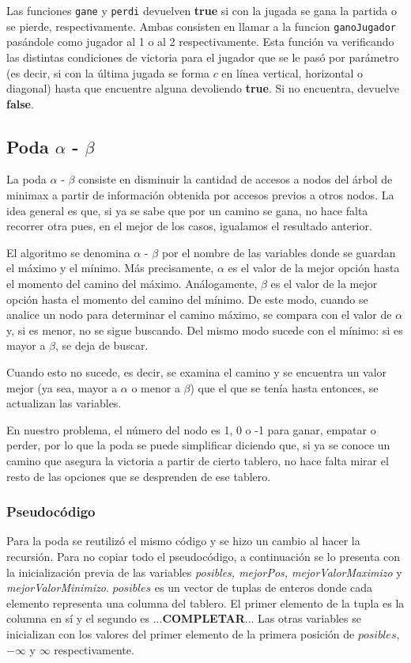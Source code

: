 \documentclass[A4paper,oneside,fleqn,11pt]{article}
\theoremstyle{definition}
\begin{document}
Las funciones \texttt{gane} y \texttt{perdi} devuelven \textbf{true} si con la jugada se gana la partida o se pierde, respectivamente. Ambas consisten en llamar a la funcion \texttt{ganoJugador} pasándole como jugador al 1 o al 2 respectivamente. Esta función va verificando las distintas condiciones de victoria para el jugador que se le pasó por parámetro (es decir, si con la última jugada se forma $c$ en línea vertical, horizontal o diagonal) hasta que encuentre alguna devoliendo \textbf{true}. Si no encuentra, devuelve \textbf{false}.



\subsection{Poda $\alpha$ - $\beta$}

La poda $\alpha$ - $\beta$ consiste en disminuir la cantidad de accesos a nodos del árbol de minimax a partir de información obtenida por accesos previos a otros nodos. La idea general es que, si ya se sabe que por un camino se gana, no hace falta recorrer otra pues, en el mejor de los casos, igualamos el resultado anterior.

El algoritmo se denomina $\alpha$ - $\beta$ por el nombre de las variables donde se guardan el máximo y el mínimo. Más precisamente, $\alpha$ es el valor de la mejor opción hasta el momento del camino del máximo. Análogamente, $\beta$ es el valor de la mejor opción hasta el momento del camino del mínimo. De este modo, cuando se analice un nodo para determinar el camino máximo, se compara con el valor de $\alpha$ y, si es menor, no se sigue buscando. Del mismo modo sucede con el mínimo: si es mayor a $\beta$, se deja de buscar.

Cuando esto no sucede, es decir, se examina el camino y se encuentra un valor mejor (ya sea, mayor a $\alpha$ o menor a $\beta$) que el que se tenía hasta entonces, se actualizan las variables.

En nuestro problema, el número del nodo es 1, 0 o -1 para ganar, empatar o perder, por lo que la poda se puede simplificar diciendo que, si ya se conoce un camino que asegura la victoria a partir de cierto tablero, no hace falta mirar el resto de las opciones que se desprenden de ese tablero.

\subsubsection{Pseudocódigo}
Para la poda se reutilizó el mismo código y se hizo un cambio al hacer la recursión. Para no copiar todo el pseudocódigo, a continuación se lo presenta con la inicialización previa de las variables \textit{posibles, mejorPos, mejorValorMaximizo} y \textit{mejorValorMinimizo}. $posibles$ es un vector de tuplas de enteros donde cada elemento representa una columna del tablero. El primer elemento de la tupla es la columna en sí y el segundo es ...\textbf{COMPLETAR}... Las otras variables se inicializan con los valores del primer elemento de la primera posición de $posibles$, $-\infty$ y $\infty$ respectivamente.
\end{document}
